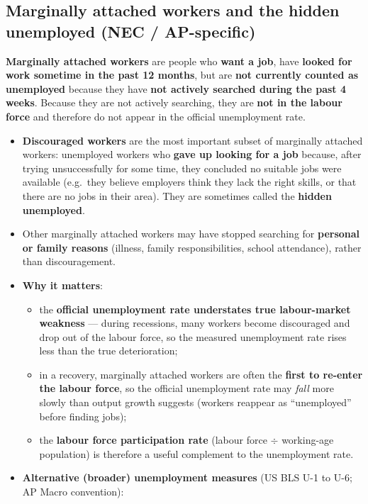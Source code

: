 \documentclass[a4paper,12pt]{article}
\newcommand{\needbold}[1]{\textcolor{red!70!black}{\textbf{#1}}}
\begin{document}
\subsection*{Marginally attached workers and the hidden unemployed (NEC / AP-specific)}\label{sec:add-marginal}
\needbold{Marginally attached workers} are people who \textbf{want a job}, have \textbf{looked for work sometime in the past 12 months}, but are \textbf{not currently counted as unemployed} because they have \textbf{not actively searched during the past 4 weeks}. Because they are not actively searching, they are \textbf{not in the labour force} and therefore do not appear in the official unemployment rate.
\begin{itemize}
  \item \needbold{Discouraged workers} are the most important subset of marginally attached workers: unemployed workers who \textbf{gave up looking for a job} because, after trying unsuccessfully for some time, they concluded no suitable jobs were available (e.g.\ they believe employers think they lack the right skills, or that there are no jobs in their area). They are sometimes called the \textbf{hidden unemployed}.
  \item Other marginally attached workers may have stopped searching for \textbf{personal or family reasons} (illness, family responsibilities, school attendance), rather than discouragement.
  \item \textbf{Why it matters}:
  \begin{itemize}
    \item the \textbf{official unemployment rate understates true labour-market weakness} --- during recessions, many workers become discouraged and drop out of the labour force, so the measured unemployment rate rises less than the true deterioration;
    \item in a recovery, marginally attached workers are often the \textbf{first to re-enter the labour force}, so the official unemployment rate may \textit{fall} more slowly than output growth suggests (workers reappear as ``unemployed'' before finding jobs);
    \item the \textbf{labour force participation rate} (labour force $\div$ working-age population) is therefore a useful complement to the unemployment rate.
  \end{itemize}
  \item \textbf{Alternative (broader) unemployment measures} (US BLS U-1 to U-6; AP Macro convention):
  \begin{itemize}

\end{itemize}
\end{itemize}
\end{document}
